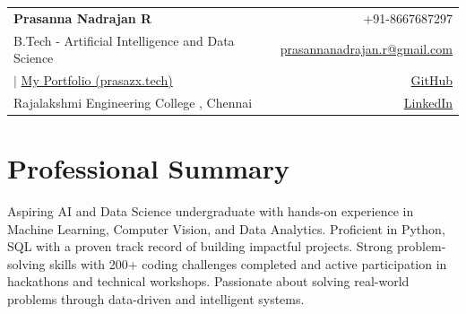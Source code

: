 \documentclass[a4paper,11pt]{article}
\makeatletter
\newcommand{\resumeSubHeadingListStart}{\begin{itemize}[leftmargin=*,labelsep=0mm]}
\newcommand{\resumeSubHeadingListEnd}{\end{itemize}\vspace{2mm}}
\newcommand{\resumeSubheading}[4]{
\vspace{1mm}\item
    \begin{tabular*}{0.98\textwidth}[t]{l@{\extracolsep{\fill}}r}
        \textbf{#1} & \textit{\footnotesize{#4}} \\
        \textit{\footnotesize{#3}} &  \footnotesize{#2}\\
    \end{tabular*}
    \vspace{0mm}
}
\newcommand{\name}{Prasanna Nadrajan R} %
\newcommand{\phone}{8667687297} %
\newcommand{\emaila}{prasannanadrajan.r@gmail.com} %
\newcommand{\github}{https://github.com/Prasanna-Nadrajan} %
\newcommand{\website}{https://prasazx.tech/} %
\newcommand{\linkedin}{https://www.linkedin.com/in/prasannanadrajan}
\newcommand{\college}{Rajalakshmi Engineering College , Chennai}
\makeatother
\begin{document}
\parbox{\dimexpr\linewidth\relax}{
\begin{tabularx}{\linewidth}{L r}
  \textbf{\LARGE \name} & +91-\phone\\
  {B.Tech - Artificial Intelligence and Data Science} &  \href{mailto:\emaila}{\emaila}\\
  $|$ \href{\website}{My Portfolio (prasazx.tech)} &  \href{\github}{GitHub} \\
  {\college} &  \href{\linkedin}{LinkedIn}\\
   
\end{tabularx}
}

\vspace{-1mm}

\section{\textbf{Professional Summary}}
\small{Aspiring AI and Data Science undergraduate with hands-on experience in Machine Learning, Computer Vision, and Data Analytics. Proficient in Python, SQL with a proven track record of building impactful projects. Strong problem-solving skills with 200+ coding challenges completed and active participation in hackathons and technical workshops. Passionate about solving real-world problems through data-driven and intelligent systems.  }

\end{document}
